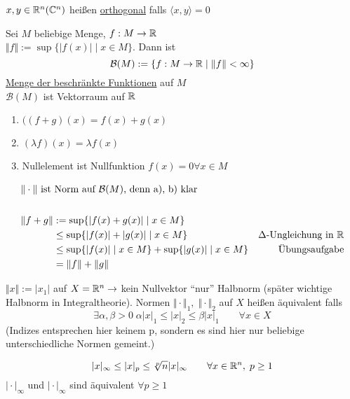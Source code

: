 \begin{mydefn}[Orthogonalität]
    $x,y \in \mathbb{R}^n(\mathbb{C}^n)$ heißen \underline{orthogonal} falls $\langle x,y\rangle =0$
\end{mydefn}

\begin{exmpn}
    Sei $M$ beliebige Menge, $f: M \to \mathbb{R}$\\
    $\Vert f\Vert:= \sup\{\vert f(x) \vert \mid x\in M\}$. Dann ist \\
    \[\mathcal{B}(M):= \{f: M \to \mathbb{R} \mid \Vert f\Vert < \infty\}\]
    \underline{Menge der beschränkte Funktionen} auf $M$\\
    $\mathcal{B}(M)$ ist Vektorraum auf $\mathbb{R}$
    \begin{enumerate}[label={\alph*)}]
        \item $((f+g)(x) = f(x) + g(x)$
        \item $(\lambda f)(x) = \lambda f(x)$
        \item Nullelement ist Nullfunktion $f(x)=0 \forall x \in M$
    \end{enumerate}
    \begin{align*}
        \shortintertext{$\Vert \cdot\Vert$ ist Norm auf $\mathcal{B}(M)$, denn a), b) klar}\\
        \Vert f+g\Vert&:=\sup\{\vert f(x)+g(x) \vert\mid x \in M\}&\\
        &\leq \sup\{\vert f(x) \vert + \vert g(x) \vert\mid x\in M \} & \Delta\text{-Ungleichung in }\mathbb{R}\\
        &\leq \sup\{\vert f(x) \vert\mid x \in M \} + \sup\{\vert g(x) \vert\mid x \in M \} & \text{Übungsaufgabe}\\
        &=\Vert f\Vert + \Vert g\Vert
    \end{align*}
\end{exmpn}

\begin{exmpn}
	$\Vert x \Vert:=\vert x_1 \vert$ auf $X=\mathbb{R}^n \to$ kein Nullvektor ``nur'' Halbnorm (später wichtige Halbnorm in Integraltheorie). Normen $\Vert \cdot \Vert_1,\;\Vert \cdot \Vert_2$ auf $X$ heißen äquivalent falls
    \[
    \exists \alpha,\beta > 0\;\alpha \vert x \vert_1 \leq \vert x \vert_2 \leq \beta\vert x \vert_1\qquad\forall x \in X
    \]
    (Indizes entsprechen hier keinem p, sondern es sind hier nur beliebige unterschiedliche Normen gemeint.)
\end{exmpn}

\begin{exmpn}
	\[
    \vert x \vert_{\infty} \leq \vert x \vert_p \leq \sqrt[p]{n}\vert x \vert_{\infty}\qquad \forall x \in \mathbb{R}^n,\;p\geq 1\\
    \]
    $\vert \cdot \vert_\infty$ und $\vert \cdot \vert_\infty$ sind äquivalent $\forall p \geq 1$
\end{exmpn}

